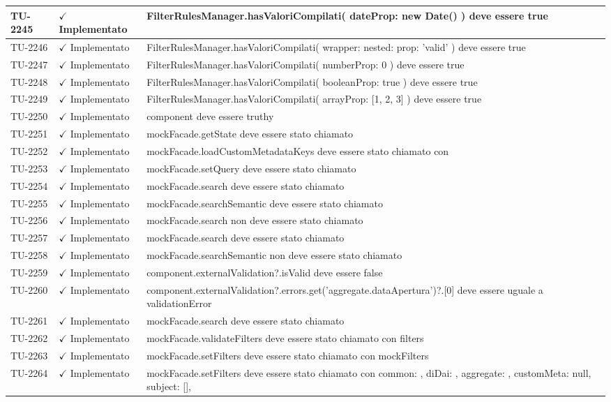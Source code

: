 ﻿\documentclass[a4paper,12pt]{article}
\newcommand{\ok}{\textcolor{green!60!black}{$\checkmark$ Implementato}}
\begin{document}
\begin{longtable}{|p{2cm}|p{3.5cm}|p{9.5cm}|}
\hline
TU-2245 & \ok & FilterRulesManager.hasValoriCompilati({ dateProp: new Date() }) deve essere true \\
\hline
TU-2246 & \ok & FilterRulesManager.hasValoriCompilati({ wrapper: { nested: { prop: 'valid' } } }) deve essere true \\
\hline
TU-2247 & \ok & FilterRulesManager.hasValoriCompilati({ numberProp: 0 }) deve essere true \\
\hline
TU-2248 & \ok & FilterRulesManager.hasValoriCompilati({ booleanProp: true }) deve essere true \\
\hline
TU-2249 & \ok & FilterRulesManager.hasValoriCompilati({ arrayProp: [1, 2, 3] }) deve essere true \\
\hline
TU-2250 & \ok & component deve essere truthy \\
\hline
TU-2251 & \ok & mockFacade.getState deve essere stato chiamato \\
\hline
TU-2252 & \ok & mockFacade.loadCustomMetadataKeys deve essere stato chiamato con \\
\hline
TU-2253 & \ok & mockFacade.setQuery deve essere stato chiamato \\
\hline
TU-2254 & \ok & mockFacade.search deve essere stato chiamato \\
\hline
TU-2255 & \ok & mockFacade.searchSemantic deve essere stato chiamato \\
\hline
TU-2256 & \ok & mockFacade.search non deve essere stato chiamato \\
\hline
TU-2257 & \ok & mockFacade.search deve essere stato chiamato \\
\hline
TU-2258 & \ok & mockFacade.searchSemantic non deve essere stato chiamato \\
\hline
TU-2259 & \ok & component.externalValidation?.isValid deve essere false \\
\hline
TU-2260 & \ok & component.externalValidation?.errors.get('aggregate.dataApertura')?.[0] deve essere uguale a validationError \\
\hline
TU-2261 & \ok & mockFacade.search deve essere stato chiamato \\
\hline
TU-2262 & \ok & mockFacade.validateFilters deve essere stato chiamato con filters \\
\hline
TU-2263 & \ok & mockFacade.setFilters deve essere stato chiamato con mockFilters \\
\hline
TU-2264 & \ok & mockFacade.setFilters deve essere stato chiamato con { common: {}, diDai: {}, aggregate: {}, customMeta: null, subject: [], } \\

\end{longtable}
\end{document}

